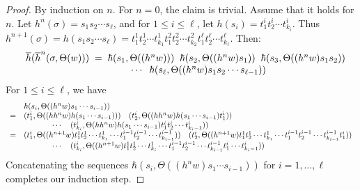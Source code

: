 \begin{proof} By induction on $n$.
  For $n = 0$, the claim is trivial.   Assume that it holds for $n$.
  Let $h^n(\sigma) = s_1 s_2 \cdots s_{\ell}$,
  and  for $1\leq i \leq \ell$,
  let $h(s_i) = t^i_1 t^i_2 \cdots t^i_{k_i}$.  Thus
  $
  h^{n+1}(\sigma) =
  h(s_1 s_2\cdots s_{\ell}) = t^1_1 t^1_2 \cdots t^1_{k_1} t^2_1 t^2_2 \cdots t^2_{k_2}
  t^\ell_1 t^\ell_2 \cdots t^\ell_{k_\ell}
  $.
  Then:
  $$\begin{array}{clcl}
& \overline{h}(\overline{h}^n(\sigma, \Theta(w))) 
  \;=\; \hbar(s_1, \Theta((h^n w)))\;\; \hbar(s_2, \Theta((h^n w)s_1))
  \;\; \hbar(s_3, \Theta((h^n w)s_1s_2))\\
  & \hspace{1.5in}\cdots\;\; \hbar(s_{\ell},
   \Theta((h^n w)s_1s_2\cdots s_{\ell-1}))
  \end{array}
  $$
  For $1\leq i \leq \ell$, we have
  $$\begin{array}{clcl}
   & \hbar(s_i, \Theta((h^n w)s_1\cdots s_{i-1})) \\
   = &   (t^i_1, \Theta((h h^n w)h(s_1\cdots s_{i-1})))
   \quad (t^i_2, \Theta((hh^nw)h(s_1\cdots s_{i-1})t^i_1))
\\
   & \hspace{.5in}\cdots\quad 
  (t^i_{k_i}, \Theta(hh^nw)h(s_1\cdots s_{i-1}) t^i_1 t^i_2\cdots t^i_{k_i-1}))  \\
  = & (t^i_1, \Theta((h^{n+1}w) t^1_1 t^1_2 \cdots t^1_{k_1} \cdots t^{i-1}_1 t^{i-1}_2 \cdots t^{i-1}_{k_{i-1}}))
  \quad 
  (t^i_2, \Theta((h^{n+1}w) t^1_1 t^1_2 \cdots
   t^1_{k_1} \cdots t^{i-1}_1 t^{i-1}_2 \cdots t^{i-1}_{k_{i-1}} t^i_1))
   \\
   & \hspace{.5in} \cdots \quad 
   (t^i_{k_i}, \Theta((h^{n+1}w) t^1_1 t^1_2 \cdots
   t^1_{k_i} \cdots t^{i-1}_1 t^{i-1}_2 \cdots t^{i-1}_{k_{i-1}} t^i_1 \cdots t^i_{k_i -1}))
  \end{array}
  $$
  Concatenating the  sequences $\hbar(s_i, \Theta((h^n w)s_1\cdots s_{i-1}))$
  for $i = 1, \ldots, \ell$ completes our induction step.
\end{proof}



